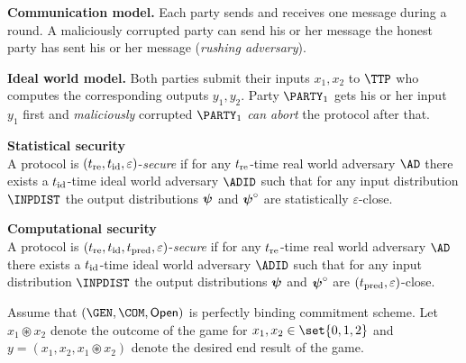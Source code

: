 \documentclass[landscape,footrule]{foils}
\newcommand{\lastline}{\vspace*{-2ex}}
\begin{document}
\textbf{Communication model.}  Each party sends and receives one
message during a round. A maliciously corrupted party can send his or
her message the honest party has sent his or her message
(\emph{rushing adversary}).
\bigskip


\textbf{Ideal world model.} Both parties submit their inputs $x_1,x_2$
to $\TTP$ who computes the corresponding outputs $y_1,y_2$. Party
$\PARTY_1$ gets his or her input $y_1$ first and \emph{maliciously}
corrupted $\PARTY_1$ \emph{can abort} the protocol after that.
\lastline




\textbf{Statistical security}\vspace*{0.5ex}\\
A protocol is $(t_{\mathrm{re}},t_{\mathrm{id}},\varepsilon)$-\emph{secure} if for any
$t_{\mathrm{re}}$-time real world adversary $\AD$ there exists a $t_{\mathrm{id}}$-time
ideal world adversary $\ADID$ such that for any input distribution
$\INPDIST$ the output distributions $\boldsymbol{\psi}$ and
$\boldsymbol{\psi}^\circ$ are statistically $\varepsilon$-close.
\Bigskip

\textbf{Computational security}\vspace*{0.5ex}\\
A protocol is $(t_{\mathrm{re}},t_{\mathrm{id}},t_{\mathrm{pred}},\varepsilon)$-\emph{secure} if for
any $t_{\mathrm{re}}$-time real world adversary $\AD$ there exists a $t_{\mathrm{id}}$-time
ideal world adversary $\ADID$ such that for any input distribution
$\INPDIST$ the output distributions $\boldsymbol{\psi}$ and
$\boldsymbol{\psi}^\circ$ are  $(t_{\mathrm{pred}},\varepsilon)$-close.




\enlargethispage{1cm}




Assume that $(\GEN,\COM,\OPEN)$ is perfectly binding commitment scheme.
Let $x_1\circledast x_2$ denote the outcome of the game for
$x_1,x_2\in\set{0,1,2}$ and $y=(x_1,x_2,x_1\circledast x_2)$
denote the desired end result of the game.
\end{document}
